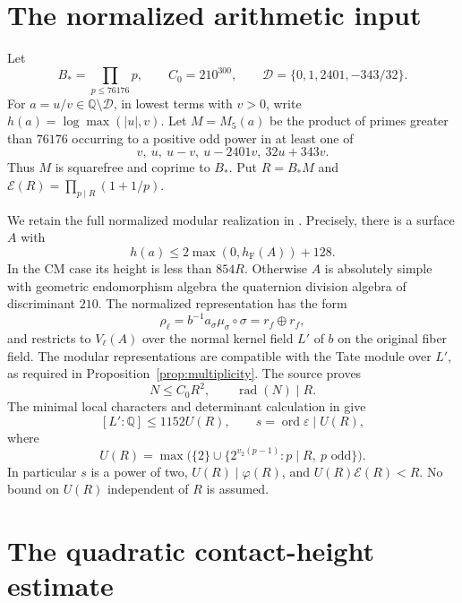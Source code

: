 \documentclass[11pt,a4paper]{article}
\newcommand{\Q}{\mathbb Q}
\newcommand{\hF}{h_{\mathrm F}}
\DeclareMathOperator{\ord}{ord}
\begin{document}
\section{The normalized arithmetic input}

Let
\[
 B_*=\prod_{p\le76176}p,\qquad C_0=210^{300},\qquad
 \mathcal D=\{0,1,2401,-343/32\}.
\]
For \(a=u/v\in\Q\setminus\mathcal D\), in lowest terms with \(v>0\),
write \(h(a)=\log\max(|u|,v)\). Let \(M=M_5(a)\) be the product
of primes greater than \(76176\) occurring to a positive odd
power in at least one of
\[
                 v,\ u,\ u-v,\ u-2401v,\ 32u+343v.
\]
Thus \(M\) is squarefree and coprime to \(B_*\). Put \(R=B_*M\)
and \(\mathcal E(R)=\prod_{p\mid R}(1+1/p)\).

We retain the full normalized modular realization in
\cite[proof of \texttt{o8-height}, equations (LR2)--(LR5)]{Source}.
Precisely, there is a surface \(A\) with
\[
                  h(a)\le2\max(0,\hF(A))+128.
\]
In the CM case its height is less than \(854R\).
Otherwise \(A\) is absolutely simple with geometric endomorphism
algebra the quaternion division algebra of discriminant \(210\).
The normalized representation has the form
\[
 \rho_\ell=b^{-1}a_\sigma\mu_\sigma\circ\sigma
              =r_f\oplus r_f,
\]
and restricts to \(V_\ell(A)\) over the normal kernel field \(L'\)
of \(b\) on the original fiber field. The modular representations
are compatible with the Tate module over \(L'\), as required in
Proposition~\ref{prop:multiplicity}. The source proves
\[
 N\le C_0R^2,\qquad \operatorname{rad}(N)\mid R.
\]
The minimal local characters and determinant calculation in
\cite[Sections~1--2]{Characters} give
\[
 [L':\Q]\le1152U(R),\qquad s=\ord\varepsilon\mid U(R),
\]
where
\[
 U(R)=\max\bigl(\{2\}\cup
             \{2^{v_2(p-1)}:p\mid R,\ p\text{ odd}\}\bigr).
\]
In particular \(s\) is a power of two,
\(U(R)\mid\varphi(R)\), and \(U(R)\mathcal E(R)<R\).
No bound on \(U(R)\) independent of \(R\) is assumed.

\section{The quadratic contact-height estimate}
\end{document}
